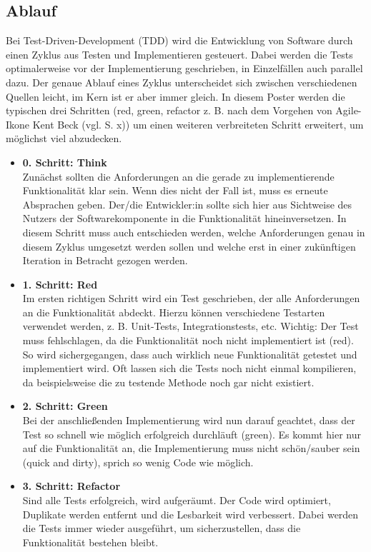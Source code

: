 \documentclass[a0,landscape]{a0poster}
\newcommand{\gqq}[1]{\glqq #1\grqq}
\begin{document}
\begin{multicols}{4}
\section*{Ablauf} %

Bei Test-Driven-Development (TDD) wird die Entwicklung von Software durch einen Zyklus aus Testen und Implementieren gesteuert.
Dabei werden die Tests optimalerweise vor der Implementierung geschrieben, in Einzelfällen auch parallel dazu.
Der genaue Ablauf eines Zyklus unterscheidet sich zwischen verschiedenen Quellen leicht, im Kern ist er aber immer gleich.
In diesem Poster werden die typischen drei Schritten (\gqq{red, green, refactor} z. B. nach dem Vorgehen von \gqq{Agile-Ikone} Kent Beck (vgl. \cite{beck_test_2022} S. x)) um einen weiteren verbreiteten Schritt erweitert, um möglichst viel abzudecken. 

\begin{itemize}
\item \textbf{0. Schritt: \gqq{Think}}\\
Zunächst sollten die Anforderungen an die gerade zu implementierende Funktionalität klar sein.
Wenn dies nicht der Fall ist, muss es erneute Absprachen geben.
Der/die Entwickler:in sollte sich hier aus Sichtweise des Nutzers der Softwarekomponente in die Funktionalität hineinversetzen.
In diesem Schritt muss auch entschieden werden, welche Anforderungen genau in diesem Zyklus umgesetzt werden sollen und welche erst in einer zukünftigen Iteration in Betracht gezogen werden.
\item \textbf{1. Schritt: \gqq{Red}}\\
Im ersten richtigen Schritt wird ein Test geschrieben, der alle Anforderungen an die Funktionalität abdeckt.
Hierzu können verschiedene Testarten verwendet werden, z. B. Unit-Tests, Integrationstests, etc.
Wichtig: Der Test muss fehlschlagen, da die Funktionalität noch nicht implementiert ist (\gqq{red}).
So wird sichergegangen, dass auch wirklich neue Funktionalität getestet und implementiert wird.
Oft lassen sich die Tests noch nicht einmal kompilieren, da beispielsweise die zu testende Methode noch gar nicht existiert.
\item \textbf{2. Schritt: \gqq{Green}}\\
Bei der anschließenden Implementierung wird nun darauf geachtet, dass der Test so schnell wie möglich erfolgreich durchläuft (\gqq{green}).
Es kommt hier nur auf die Funktionalität an, die Implementierung muss nicht \gqq{schön/sauber} sein (\gqq{quick and dirty}), sprich \gqq{so wenig Code wie möglich}.
\item \textbf{3. Schritt: \gqq{Refactor}}\\
Sind alle Tests erfolgreich, wird \gqq{aufgeräumt}.
Der Code wird optimiert, Duplikate werden entfernt und die Lesbarkeit wird verbessert.
Dabei werden die Tests immer wieder ausgeführt, um sicherzustellen, dass die Funktionalität bestehen bleibt.
\end{itemize}


\end{multicols}
\end{document}
